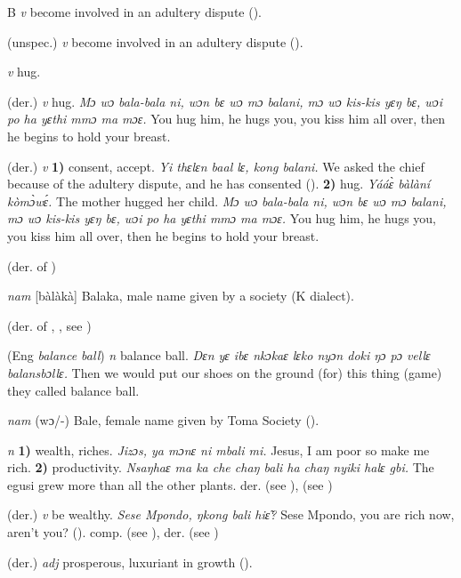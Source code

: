 \begin{letter}{B}
 \textit{v} become involved in an adultery dispute (\citealt{Pichl1967}).

 (unspec.) \textit{v} become involved in an adultery dispute (\citealt{Pichl1967}). 

 \textit{v} hug.

 (der.) \textit{v} hug. \textit{Mɔ wɔ bala-bala ni, wɔn bɛ wɔ mɔ balani, mɔ wɔ kis-kis yɛŋ bɛ, wɔi po ha yɛthi mmɔ ma mɔɛ.} You hug him, he hugs you, you kiss him all over, then he begins to hold your breast.

 (der.) \textit{v} \textbf{1)} consent, accept. \textit{Yi thɛlɛn baal lɛ, kong balani.} We asked the chief because of the adultery dispute, and he has consented (\citealt{Pichl1967}). \textbf{2)} hug. \textit{Yááɛ̀ bàlàní kòmɔ̀wɛ́.} The mother hugged her child. \textit{Mɔ wɔ bala-bala ni, wɔn bɛ wɔ mɔ balani, mɔ wɔ kis-kis yɛŋ bɛ, wɔi po ha yɛthi mmɔ ma mɔɛ.} You hug him, he hugs you, you kiss him all over, then he begins to hold your breast.

 (der. of ) 

 \textit{nam} [bàlàkà] Balaka, male name given by a society (K dialect).

 (der. of , , see ) 

 (Eng \textit{balance ball}) \textit{n} balance ball. \textit{Dɛn yɛ ibɛ nkɔkaɛ lɛko nyɔn doki ŋɔ pɔ vellɛ balansbɔllɛ.} Then we would put our shoes on the ground (for) this thing (game) they called balance ball.

 \textit{nam} (wɔ/-) Bale, female name given by Toma Society (\citealt{Pichl1967}). 

 \textit{n} \textbf{1)} wealth, riches. \textit{Jizɔs, ya mɔnɛ ni mbali mi.} Jesus, I am poor so make me rich. \textbf{2)} productivity. \textit{Nsaŋhaɛ ma ka che chaŋ bali ha chaŋ nyiki halɛ gbi.} The egusi grew more than all the other plants. der.  (see ),  (see )

 (der.) \textit{v} be wealthy. \textit{Sese Mpondo, ŋkong bali hiɛ̃?} Sese Mpondo, you are rich now, aren't you? (\citealt{Pichl1967}). comp.  (see ), der.  (see )

 (der.) \textit{adj} prosperous, luxuriant in growth (\citealt{Sumner1921}). 


\end{letter}
